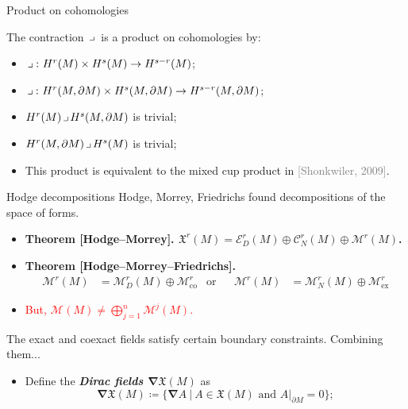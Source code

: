 \documentclass[aspectratio=169]{beamer}
\newcommand\boldgreen[1]{\textcolor{lighter_csu_green}{\emph{\textbf{#1}}}}
\newcommand\boldgold[1]{\textcolor{csu_gold}{\textbf{#1}}}
\newcommand\grey[1]{\textcolor{gray}{#1}}
\newcommand{\grad}{\boldsymbol{\nabla}}
\newcommand{\monogenics}{\mathcal{M}}
\newcommand{\boundary}{{\partial M}}
\newcommand{\contract}{\hspace*{.5mm} \lrcorner \hspace*{.5mm}}
\newcommand{\monogenicfields}[1]{\mathcal{M}^{#1}(M)}
\newcommand{\smoothfields}{\mathfrak{X}}
\begin{document}
\begin{frame}{Product on cohomologies}
\vfill
\begin{proposition*}{}{}
The contraction $\contract$ is a product on cohomologies by:
\textcolor{lighter_csu_green}{
\begin{itemize}
\item $\contract \colon H^r(M)\times H^s(M) \to H^{s-r}(M)$;
\item $\contract \colon H^r(M,\boundary)\times H^s(M,\boundary) \to H^{s-r}(M,\boundary)$;
\item $H^r(M)\contract H^s(M,\boundary)$ is trivial;
\item $H^r(M,\boundary)\contract H^s(M)$ is trivial;
\end{itemize}
}
\end{proposition*}
\pause
\begin{itemize}
  \item This product is equivalent to the mixed cup product in \grey{[Shonkwiler, 2009]}.
\end{itemize}
\vfill
\end{frame}


\begin{frame}{Hodge decompositions}
\vfill
Hodge, Morrey, Friedrichs found decompositions of the space of forms.
\begin{itemize}
  \pause
  \item \boldgold{Theorem [Hodge--Morrey]. $\smoothfields^r(M) = \mathcal{E}_D^r(M) \oplus \mathcal{C}_N^r(M) \oplus \monogenics^r(M)$.}
  \pause
  \item \boldgold{Theorem [Hodge--Morrey--Friedrichs].
  \begin{align*}
  \monogenics^r(M) &= \monogenics^r_D(M) \oplus \monogenics^r_{\textrm{co}} &\textrm{or} && \monogenics^r(M) &= \monogenics^r_N(M) \oplus \monogenics^r_{\textrm{ex}}
  \end{align*}
  }
  \pause
  \item \textcolor{red}{But, $\monogenicfields{} \neq \bigoplus_{j=1}^n \monogenicfields{j}$.}
\end{itemize}
\vfill
\end{frame}

\begin{frame}{}
\vfill
The exact and coexact fields satisfy certain boundary constraints. Combining them...
\begin{itemize}
  \pause
  \item Define the \boldgreen{Dirac fields $\grad \smoothfields(M)$} as
  \[
      \grad \smoothfields(M) \coloneqq \{ \grad A ~\vert~ A \in \smoothfields(M) \textrm{~and~} A\vert_\boundary = 0\};
  \]
\end{itemize}
\vfill
\end{frame}
\end{document}
